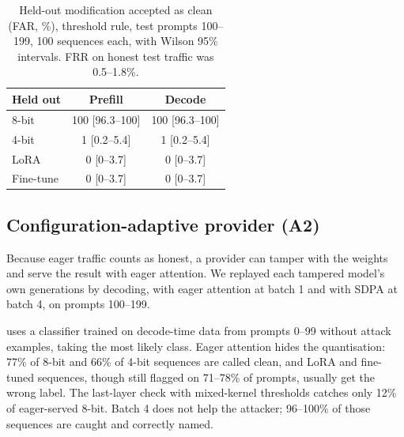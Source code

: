 \documentclass[11pt]{article}
\newcommand{\ci}[2]{{\scriptsize[#1--#2]}}
\begin{document}
\begin{table}[!htb]
\centering
\small
\caption{Held-out modification accepted as clean (FAR, \%), threshold rule, test prompts 100--199, 100 sequences each, with Wilson 95\% intervals. FRR on honest test traffic was 0.5--1.8\%.}
\label{tab:open}
\begin{tabular}{@{}lcc@{}}
\toprule
Held out & Prefill & Decode \\
\midrule
8-bit     & 100 \ci{96.3}{100} & 100 \ci{96.3}{100} \\
4-bit     & 1 \ci{0.2}{5.4}    & 1 \ci{0.2}{5.4} \\
LoRA      & 0 \ci{0}{3.7}      & 0 \ci{0}{3.7} \\
Fine-tune & 0 \ci{0}{3.7}      & 0 \ci{0}{3.7} \\
\bottomrule
\end{tabular}
\end{table}

\subsection{Configuration-adaptive provider (A2)}
\label{sec:res-attack}

Because eager traffic counts as honest, a provider can tamper with the weights and serve the result with eager attention.
We replayed each tampered model's own generations by decoding, with eager attention at batch 1 and with SDPA at batch 4, on prompts 100--199.

 uses a classifier trained on decode-time data from prompts 0--99 without attack examples, taking the most likely class.
Eager attention hides the quantisation: 77\% of 8-bit and 66\% of 4-bit sequences are called clean, and LoRA and fine-tuned sequences, though still flagged on 71--78\% of prompts, usually get the wrong label.
The last-layer check with mixed-kernel thresholds catches only 12\% of eager-served 8-bit.
Batch 4 does not help the attacker; 96--100\% of those sequences are caught and correctly named.
\end{document}
